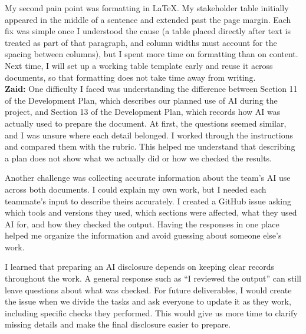 \documentclass{article}
\begin{document}
My second pain point was formatting in \LaTeX{}. My stakeholder table initially appeared in the middle of a sentence and extended past the page margin. Each fix was simple once I understood the cause (a table placed directly after text is treated as part of that paragraph, and column widths must account for the spacing between columns), but I spent more time on formatting than on content. Next time, I will set up a working table template early and reuse it across documents, so that formatting does not take time away from writing.
\newline \\
\textbf{Zaid:} One difficulty I faced was understanding the difference between Section 11 of the Development Plan, which describes our planned use of AI during the project, and Section 13 of the Development Plan, which records how AI was actually used to prepare the document. At first, the questions seemed similar, and I was unsure where each detail belonged. I worked through the instructions and compared them with the rubric. This helped me understand that describing a plan does not show what we actually did or how we checked the results.

Another challenge was collecting accurate information about the team's AI use across both documents. I could explain my own work, but I needed each teammate's input to describe theirs accurately. I created a GitHub issue asking which tools and versions they used, which sections were affected, what they used AI for, and how they checked the output. Having the responses in one place helped me organize the information and avoid guessing about someone else's work. 

I learned that preparing an AI disclosure depends on keeping clear records throughout the work. A general response such as ``I reviewed the output'' can still leave questions about what was checked. For future deliverables, I would create the issue when we divide the tasks and ask everyone to update it as they work, including specific checks they performed. This would give us more time to clarify missing details and make the final disclosure easier to prepare.
\end{document}
